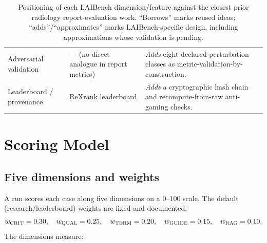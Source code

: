 \documentclass[11pt]{article}
\newcommand{\dimname}[1]{\textsc{#1}}
\begin{document}
\begin{table}[t]
\begin{tabular}{@{}p{2.2cm}p{4.3cm}p{6.0cm}@{}}
Adversarial validation &
--- (no direct analogue in report metrics) &
\emph{Adds} eight declared perturbation classes as metric-validation-by-
construction. \\
Leaderboard / provenance &
ReXrank leaderboard \cite{Zhang2024ReXrank} &
\emph{Adds} a cryptographic hash chain and recompute-from-raw anti-gaming
checks. \\
\bottomrule
\end{tabular}
\caption{Positioning of each LAIBench dimension/feature against the closest
prior radiology report-evaluation work. ``Borrows'' marks reused ideas;
``adds''/``approximates'' marks LAIBench-specific design, including approximations
whose validation is pending.}
\label{tab:related}
\end{table}

\section{Scoring Model}
\label{sec:scoring}

\subsection{Five dimensions and weights}

A run scores each case along five dimensions on a $0$--$100$ scale. The default
(research/leaderboard) weights are fixed and documented:
\[
w_{\dimname{CRIT}}=0.30,\quad
w_{\dimname{QUAL}}=0.25,\quad
w_{\dimname{TERM}}=0.20,\quad
w_{\dimname{GUIDE}}=0.15,\quad
w_{\dimname{RAG}}=0.10 .
\]
The dimensions measure:
\end{document}
